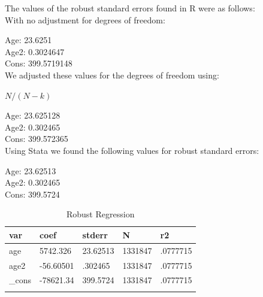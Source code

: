 \documentclass{article}
\begin{document}
\begin{enumerate}[label=\alph*]
The values of the robust standard errors found in R were as follows:\\
With no adjustment for degrees of freedom:

Age:  23.6251\\
Age2:  0.3024647\\
Cons:  399.5719148\\

We adjusted these values for the degrees of freedom using:

$ N/(N-k)$

Age:  23.625128\\
Age2:  0.302465 \\
Cons:  399.572365\\

Using Stata we found the following values for robust standard errors:

Age:  23.62513\\
Age2:  0.302465 \\
Cons:  399.5724\\

\begin{table}[tbp] \centering
	
	\caption{Robust Regression}
	\begin{tabularx}{\textwidth}{lCCCC}
		
		\toprule
		{var}&{coef}&{stderr}&{N}&{r2} \tabularnewline
		\midrule\addlinespace[1.5ex]
		age&5742.326&23.62513&1331847&.0777715 \tabularnewline
		age2&-56.60501&.302465&1331847&.0777715 \tabularnewline
		\_cons&-78621.34&399.5724&1331847&.0777715 \tabularnewline
		\bottomrule \addlinespace[1.5ex]
		
	\end{tabularx}
\end{table}

\end{enumerate}
\end{document}
